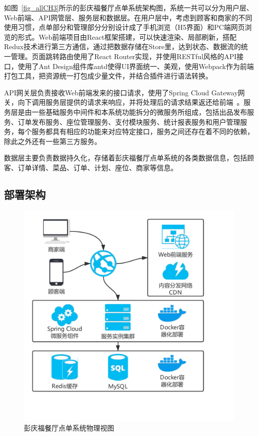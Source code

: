 如图~\ref{fig_allCH3}所示的彭庆福餐厅点单系统架构图，系统一共可以分为用户层、Web前端、API网管层、服务层和数据层。在用户层中，考虑到顾客和商家的不同使用习惯，点单部分和管理部分分别设计成了手机浏览（H5界面）和PC端网页浏览的形式。Web前端项目由React框架搭建，可以快速渲染、局部刷新，搭配Redux技术进行第三方通信，通过把数据存储在Store里，达到状态、数据流的统一管理。页面跳转路由使用了React Router实现，并使用RESTful风格的API接口，使用了Ant Design组件库antd使得UI界面统一、美观，使用Webpack作为前端打包工具，把资源统一打包成少量文件，并结合插件进行语法转换。

API网关层负责接收Web前端发来的接口请求，使用了Spring Cloud Gateway网关，向下调用服务层提供的请求来响应，并将处理后的请求结果返还给前端~\cite{lhf2013mvc}。服务层是由一些基础服务中间件和本系统功能拆分的微服务所组成，包括出品发布服务、订单发布服务、座位管理服务、支付模块服务、统计报表服务和用户管理服务，每个服务都具有相应的功能来对应特定接口，服务之间还存在着不同的依赖，除此之外还有一些第三方服务。

数据层主要负责数据持久化，存储着彭庆福餐厅点单系统的各类数据信息，包括顾客、订单详情、菜品、订单、计划、座位、商家等信息。\\

\subsection{部署架构}
\begin{figure}[htbp!]
  \centering
  \includegraphics[width=4.5in]{FIGs/chapter3/physics.pdf}
  \caption{彭庆福餐厅点单系统物理视图}\label{fig_physicsCH3}
\end{figure}

